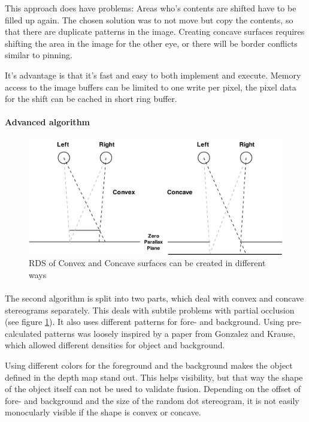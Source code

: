 This approach does have problems: Areas who's contents are shifted have to be filled up again. The chosen solution was to not move but copy the contents, so that there are duplicate patterns in the image. Creating concave surfaces requires shifting the area in the image for the other eye, or there will be border conflicts similar to pinning.

It's advantage is that it's fast and easy to both implement and execute. Memory access to the image buffers can be limited to one write per pixel, the pixel data for the shift can be cached in short ring buffer.

\paragraph{Advanced algorithm}
\begin{figure}[htb]
\begin{center}
\includegraphics[width=15.5cm]{media/rds.pdf}
\caption{RDS of Convex and Concave surfaces can be created in different ways\label{ccRDS}}
\end{center}
\end{figure}

\paragraph{}
The second algorithm is split into two parts, which deal with convex and concave stereograms separately.
This deals with subtile problems with partial occlusion (see figure \ref{ccRDS}).
It also uses different patterns for fore- and background.
Using pre-calculated patterns was loosely inspired by a paper from Gonzalez and Krause\cite{GenRDS}, which allowed different densities for object and background.

Using different colors for the foreground and the background makes the object defined in the depth map stand out. This helps visibility, but that way the shape of the object itself can not be used to validate fusion. Depending on the offset of fore- and background and the size of the random dot stereogram, it is not easily monocularly visible if the shape is convex or concave.

